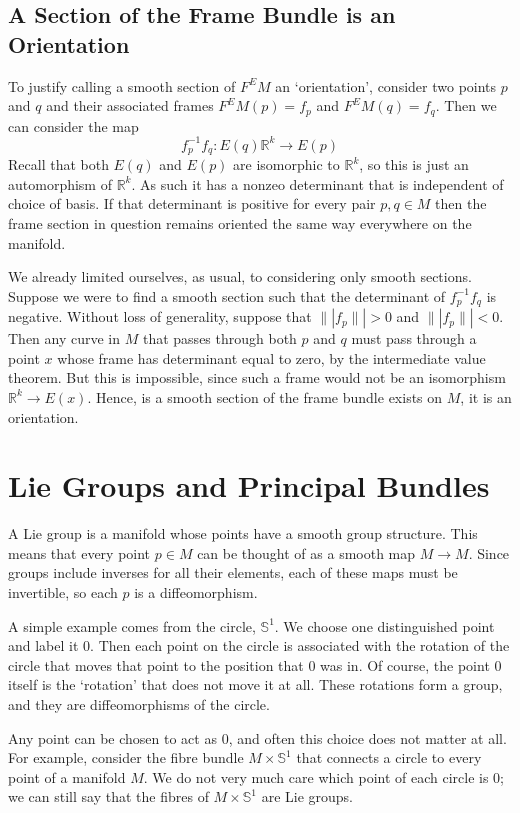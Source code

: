 \documentclass[oneside,english]{amsbook}
\numberwithin{section}{chapter}
\theoremstyle{plain}
\theoremstyle{definition}
\begin{document}
\subsection{A Section of the Frame Bundle is an Orientation}

To justify calling a smooth section of $F^EM$ an `orientation', consider two points $p$ and $q$ and their associated frames $F^EM(p) = f_p$ and $F^EM(q) = f_q$. Then we can consider the map
\[
	f_p^{-1}f_q: E(q)\mathbb{R}^k\to E(p)
\] 
Recall that both $E(q)$ and $E(p)$ are isomorphic to $\mathbb{R}^k$, so this is just an automorphism of $\mathbb{R}^k$. As such it has a nonzeo determinant that is independent of choice of basis. If that determinant is positive for every pair $p, q\in M$ then the frame section in question remains oriented the same way everywhere on the manifold.

We already limited ourselves, as usual, to considering only smooth sections. Suppose we were to find a smooth section such that the determinant of $f_p^{-1}f_q$ is negative. Without loss of generality, suppose that $\||f_p\|| > 0$ and $\||f_p\|| < 0$. Then any curve in $M$ that passes through both $p$ and $q$ must pass through a point $x$ whose frame has determinant equal to zero, by the intermediate value theorem. But this is impossible, since such a frame would not be an isomorphism $\mathbb{R}^k\to E(x)$. Hence, is a smooth section of the frame bundle exists on $M$, it is an orientation.



\section{Lie Groups and Principal Bundles}

A Lie group is a manifold whose points have a smooth group structure. This means that every point $p\in M$ can be thought of as a smooth map $M\to M$. Since groups include inverses for all their elements, each of these maps must be invertible, so each $p$ is a diffeomorphism.

A simple example comes from the circle, $\mathbb{S}^1$. We choose one distinguished point and label it $0$. Then each point on the circle is associated with the rotation of the circle that moves that point to the position that 0 was in. Of course, the point 0 itself is the `rotation' that does not move it at all. These rotations form a group, and they are diffeomorphisms of the circle. 

Any point can be chosen to act as 0, and often this choice does not matter at all. For example, consider the fibre bundle $M\times\mathbb{S}^1$ that connects a circle to every point of a manifold $M$. We do not very much care which point of each circle is 0; we can still say that the fibres of $M\times\mathbb{S}^1$ are Lie groups. 
\end{document}
